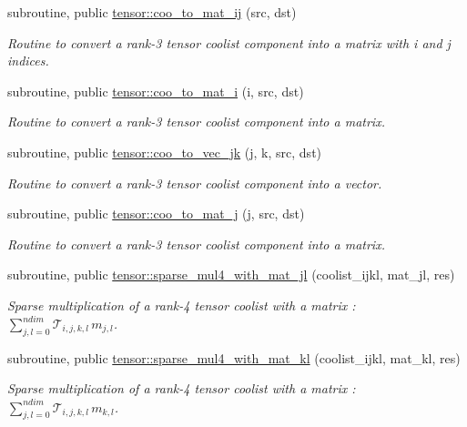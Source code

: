 \begin{DoxyCompactItemize}
subroutine, public \hyperlink{namespacetensor_af104cb6f7354f1465eb53e0f3738a3d0}{tensor\+::coo\+\_\+to\+\_\+mat\+\_\+ij} (src, dst)
\begin{DoxyCompactList}\small\item\em Routine to convert a rank-\/3 tensor coolist component into a matrix with i and j indices. \end{DoxyCompactList}\item 
subroutine, public \hyperlink{namespacetensor_ac77bcc80d4bd189835b88db68ffafda4}{tensor\+::coo\+\_\+to\+\_\+mat\+\_\+i} (i, src, dst)
\begin{DoxyCompactList}\small\item\em Routine to convert a rank-\/3 tensor coolist component into a matrix. \end{DoxyCompactList}\item 
subroutine, public \hyperlink{namespacetensor_abb370166c0ebd0885404c1703d464f89}{tensor\+::coo\+\_\+to\+\_\+vec\+\_\+jk} (j, k, src, dst)
\begin{DoxyCompactList}\small\item\em Routine to convert a rank-\/3 tensor coolist component into a vector. \end{DoxyCompactList}\item 
subroutine, public \hyperlink{namespacetensor_a2088d80a587fd931ca64976a87403401}{tensor\+::coo\+\_\+to\+\_\+mat\+\_\+j} (j, src, dst)
\begin{DoxyCompactList}\small\item\em Routine to convert a rank-\/3 tensor coolist component into a matrix. \end{DoxyCompactList}\item 
subroutine, public \hyperlink{namespacetensor_aae291b0fab419ce7692da1933105e9ae}{tensor\+::sparse\+\_\+mul4\+\_\+with\+\_\+mat\+\_\+jl} (coolist\+\_\+ijkl, mat\+\_\+jl, res)
\begin{DoxyCompactList}\small\item\em Sparse multiplication of a rank-\/4 tensor coolist with a matrix \+: ${\displaystyle \sum_{j,l=0}^{ndim}} \mathcal{T}_{i,j,k,l} \, m_{j,l} $. \end{DoxyCompactList}\item 
subroutine, public \hyperlink{namespacetensor_af65ad5ae657ecd97f70109b2c273696b}{tensor\+::sparse\+\_\+mul4\+\_\+with\+\_\+mat\+\_\+kl} (coolist\+\_\+ijkl, mat\+\_\+kl, res)
\begin{DoxyCompactList}\small\item\em Sparse multiplication of a rank-\/4 tensor coolist with a matrix \+: ${\displaystyle \sum_{j,l=0}^{ndim}} \mathcal{T}_{i,j,k,l} \, m_{k,l} $. \end{DoxyCompactList}\item 

\end{DoxyCompactItemize}
